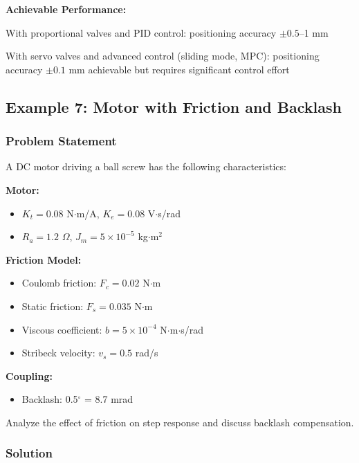 \textbf{Achievable Performance:}

With proportional valves and PID control: positioning accuracy $\pm 0.5$--1 mm

With servo valves and advanced control (sliding mode, MPC): positioning accuracy $\pm 0.1$ mm achievable but requires significant control effort

\subsection{Example 7: Motor with Friction and Backlash}

\subsubsection{Problem Statement}

A DC motor driving a ball screw has the following characteristics:

\textbf{Motor:}
\begin{itemize}
    \item $K_t = 0.08$ N$\cdot$m/A, $K_e = 0.08$ V$\cdot$s/rad
    \item $R_a = 1.2$ $\Omega$, $J_m = 5 \times 10^{-5}$ kg$\cdot$m$^2$
\end{itemize}

\textbf{Friction Model:}
\begin{itemize}
    \item Coulomb friction: $F_c = 0.02$ N$\cdot$m
    \item Static friction: $F_s = 0.035$ N$\cdot$m
    \item Viscous coefficient: $b = 5 \times 10^{-4}$ N$\cdot$m$\cdot$s/rad
    \item Stribeck velocity: $v_s = 0.5$ rad/s
\end{itemize}

\textbf{Coupling:}
\begin{itemize}
    \item Backlash: 0.5$^\circ$ = 8.7 mrad
\end{itemize}

Analyze the effect of friction on step response and discuss backlash compensation.

\subsubsection{Solution}

